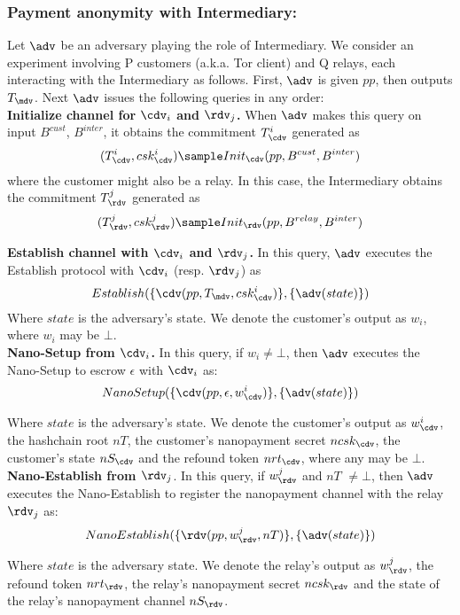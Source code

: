 \subsubsection{Payment anonymity with Intermediary:} 
\label{def:anon1}

Let $\adv$ be an adversary playing the role of Intermediary. We consider an experiment involving P customers (a.k.a. Tor client) and Q relays, each interacting with the Intermediary as follows. First, $\adv$ is given $pp$, then outputs $T_\mdv$. Next $\adv$ issues the following queries in any order:\\

\textbf{Initialize channel for $\cdv_i$ and $\rdv_j$.} When $\adv$ makes this query on input $B^{cust}$, $B^{inter}$, it obtains the commitment $T^i_\cdv$ generated as 
$$(T^i_\cdv, csk^i_\cdv) \sample Init_\cdv(pp, B^{cust}, B^{inter})$$
where the customer might also be a relay. In this case, the Intermediary obtains the commitment $T^j_\rdv$ generated as $$(T^j_\rdv, csk^j_\rdv) \sample Init_\rdv(pp, B^{relay}, B^{inter})$$  

\textbf{Establish channel with $\cdv_i$ and $\rdv_j$.} In this query, $\adv$ executes the Establish protocol with $\cdv_i$ (resp. $\rdv_j$) as
$$Establish(\{\cdv(pp, T_\mdv, csk^i_\cdv)\},\{\adv(state)\})$$
Where $state$ is the adversary's state. We denote the customer's output as $w_i$, where $w_i$ may be $\bot$.\\

\textbf{Nano-Setup from $\cdv_i$.} In this query, if $w_i \neq \bot$, then $\adv$ executes the Nano-Setup to escrow $\epsilon$ with $\cdv_i$ as:
$$Nano\-Setup(\{\cdv(pp, \epsilon, w^i_\cdv)\}, \{\adv(state)\})$$

Where $state$ is the adversary's state. We denote the customer's output as $w^i_\cdv$, the hashchain root $nT$, the customer's nanopayment secret $ncsk_\cdv$, the customer's state $nS_\cdv$ and the refound token $nrt_\cdv$, where any may be $\bot$.\\

\textbf{Nano-Establish from $\rdv_j$}. In this query, if $w^j_\rdv$ and $nT$ $\neq \bot$, then $\adv$ executes the Nano-Establish to register the nanopayment channel with the relay $\rdv_j$ as:
$$Nano\-Establish(\{\rdv(pp, w^j_\rdv, nT)\}, \{\adv(state)\})$$

Where $state$ is the adversary state. We denote the relay's output as $w^j_\rdv$, the refound token $nrt_\rdv$, the relay's nanopayment secret $ncsk_\rdv$ and the state of the relay's nanopayment channel $nS_\rdv$. \\

